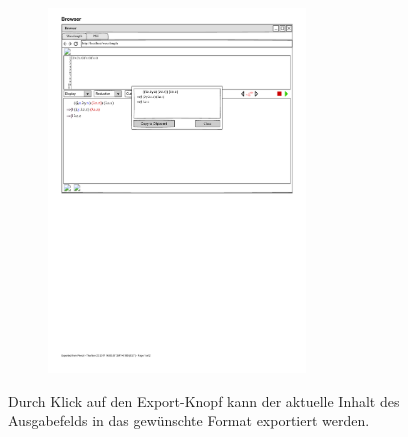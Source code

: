 \documentclass[parskip=full,11pt,twoside]{scrartcl}
\begin{document}
\begin{figure}[H]
\begin{subfigure}{0.75\textwidth}
		\includegraphics[width=0.75\textwidth]{img/wavelength_export_window_unicode}
	\end{subfigure}
	\caption{\label{fig:export}Durch Klick auf den Export-Knopf kann der aktuelle Inhalt des Ausgabefelds in das gewünschte Format exportiert werden.}
\end{figure}
\end{document}
